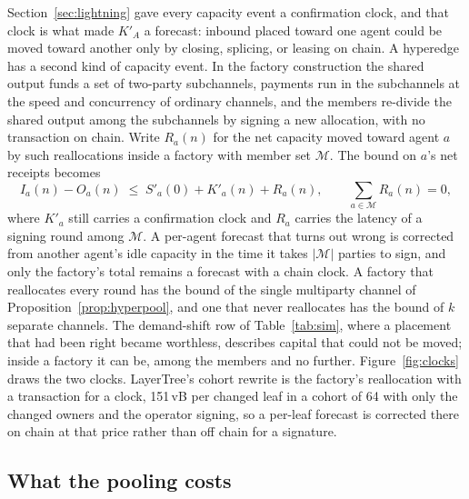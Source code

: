\documentclass[11pt]{article}
\theoremstyle{plain}
\theoremstyle{definition}
\theoremstyle{remark}
\begin{document}
Section~\ref{sec:lightning} gave every capacity event a confirmation clock, and that clock is what made $K'_A$ a forecast: inbound placed toward one agent could be moved toward another only by closing, splicing, or leasing on chain. A hyperedge has a second kind of capacity event. In the factory construction \citep{burchert2018factories} the shared output funds a set of two-party subchannels, payments run in the subchannels at the speed and concurrency of ordinary channels, and the members re-divide the shared output among the subchannels by signing a new allocation, with no transaction on chain. Write $R_a(n)$ for the net capacity moved toward agent $a$ by such reallocations inside a factory with member set $\mathcal M$. The bound on $a$'s net receipts becomes
\begin{equation}
I_a(n)-O_a(n)\;\le\;S'_a(0)+K'_a(n)+R_a(n),\qquad \sum_{a\in\mathcal M}R_a(n)=0,
\label{eq:realloc}
\end{equation}
where $K'_a$ still carries a confirmation clock and $R_a$ carries the latency of a signing round among $\mathcal M$. A per-agent forecast that turns out wrong is corrected from another agent's idle capacity in the time it takes $|\mathcal M|$ parties to sign, and only the factory's total remains a forecast with a chain clock. A factory that reallocates every round has the bound of the single multiparty channel of Proposition~\ref{prop:hyperpool}, and one that never reallocates has the bound of $k$ separate channels. The demand-shift row of Table~\ref{tab:sim}, where a placement that had been right became worthless, describes capital that could not be moved; inside a factory it can be, among the members and no further. Figure~\ref{fig:clocks} draws the two clocks. LayerTree's cohort rewrite is the factory's reallocation with a transaction for a clock, 151\,vB per changed leaf in a cohort of 64 with only the changed owners and the operator signing, so a per-leaf forecast is corrected there on chain at that price rather than off chain for a signature.



\subsection{What the pooling costs}
\end{document}
